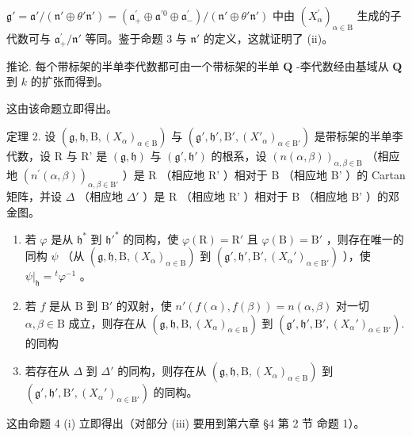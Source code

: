 \(\mathfrak{g}' = \mathfrak{a}' / (\mathfrak{n}'\oplus \theta'\mathfrak{n}') = (\mathfrak{a}_+^\prime \oplus \mathfrak{a}^{\prime 0}\oplus \mathfrak{a}_-^\prime) / (\mathfrak{n}'\oplus \theta'\mathfrak{n}')\) 中由 \((X_{\alpha}^{\prime})_{\alpha \in \mathrm{B}}\) 生成的子代数可与 \(\mathfrak{a}_+^\prime /\mathfrak{n}'\) 等同。鉴于命题 3 与 \(\mathfrak{n}'\) 的定义，这就证明了 (ii)。

推论. 每个带标架的半单李代数都可由一个带标架的半单 \(\mathbf{Q}\) -李代数经由基域从 \(\mathbf{Q}\) 到 \(k\) 的扩张而得到。

这由该命题立即得出。

定理 2. 设 \((\mathfrak{g},\mathfrak{h},\mathrm{B},(X_{\alpha})_{\alpha \in \mathrm{B}})\) 与 \((\mathfrak{g}',\mathfrak{h}',\mathrm{B}',(X'_{\alpha})_{\alpha \in \mathrm{B}'})\) 是带标架的半单李代数，设 R 与 R' 是 \((\mathfrak{g},\mathfrak{h})\) 与 \((\mathfrak{g}',\mathfrak{h}')\) 的根系，设 \((n(\alpha ,\beta))_{\alpha ,\beta \in \mathrm{B}}\) （相应地 \((n^{\prime}(\alpha ,\beta))_{\alpha ,\beta \in \mathrm{B}'}\) ）是 R （相应地 R' ）相对于 B （相应地 B' ）的 Cartan 矩阵，并设 \(\Delta\) （相应地 \(\Delta'\) ）是 R （相应地 R' ）相对于 B （相应地 B' ）的邓金图。

\begin{enumerate}
\def\labelenumi{(\roman{enumi})}
\item
  若 \(\varphi\) 是从 \(\mathfrak{h}^*\) 到 \(\mathfrak{h}'^*\) 的同构，使 \(\varphi(\mathrm{R}) = \mathrm{R}'\) 且 \(\varphi(\mathrm{B}) = \mathrm{B}'\) ，则存在唯一的同构 \(\psi\) （从 \((\mathfrak{g}, \mathfrak{h}, \mathrm{B}, (X_{\alpha})_{\alpha \in \mathrm{B}})\) 到 \((\mathfrak{g}', \mathfrak{h}', \mathrm{B}', (X_{\alpha}')_{\alpha \in \mathrm{B}'})\) ），使 \(\psi|_{\mathfrak{h}} = {}^t\varphi^{-1}\) 。
\item
  若 \(f\) 是从 \(\mathrm{B}\) 到 \(\mathrm{B}'\) 的双射，使 \(n'(f(\alpha), f(\beta)) = n(\alpha, \beta)\) 对一切 \(\alpha, \beta \in \mathrm{B}\) 成立，则存在从 \((\mathfrak{g}, \mathfrak{h}, \mathrm{B}, (X_{\alpha})_{\alpha \in \mathrm{B}})\) 到 \((\mathfrak{g}', \mathfrak{h}', \mathrm{B}', (X_{\alpha}')_{\alpha \in \mathrm{B}'}).\) 的同构
\item
  若存在从 \(\Delta\) 到 \(\Delta'\) 的同构，则存在从 \((\mathfrak{g},\mathfrak{h},\mathrm{B},(X_{\alpha})_{\alpha \in \mathrm{B}})\) 到 \((\mathfrak{g}',\mathfrak{h}',\mathrm{B}',(X_{\alpha}')_{\alpha \in \mathrm{B}'})\) 的同构。
\end{enumerate}

这由命题 4 (i) 立即得出（对部分 (iii) 要用到第六章 §4 第 2 节 命题 1）。

